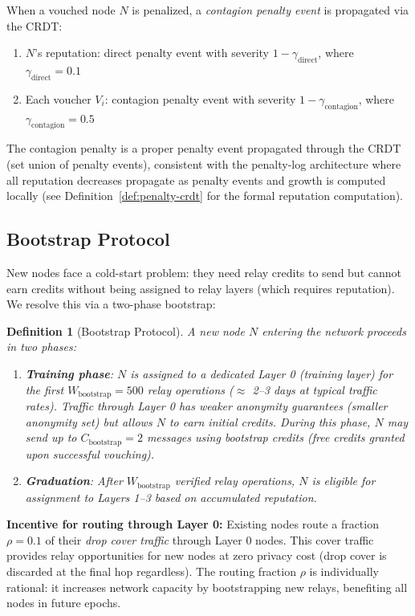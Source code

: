 \documentclass[11pt,a4paper]{article}
\newtheorem{definition}{Definition}
\begin{document}
When a vouched node $N$ is penalized, a \emph{contagion penalty event} is propagated via the CRDT:

\begin{enumerate}[nosep]
    \item $N$'s reputation: direct penalty event with severity $1 - \gamma_{\text{direct}}$, where $\gamma_{\text{direct}} = 0.1$
    \item Each voucher $V_i$: contagion penalty event with severity $1 - \gamma_{\text{contagion}}$, where $\gamma_{\text{contagion}} = 0.5$
\end{enumerate}

The contagion penalty is a proper penalty event propagated through the CRDT (set union of penalty events), consistent with the penalty-log architecture where all reputation decreases propagate as penalty events and growth is computed locally (see Definition~\ref{def:penalty-crdt} for the formal reputation computation).

\subsection{Bootstrap Protocol}
\label{sec:bootstrap}

New nodes face a cold-start problem: they need relay credits to send but cannot earn credits without being assigned to relay layers (which requires reputation). We resolve this via a two-phase bootstrap:

\begin{definition}[Bootstrap Protocol]
A new node $N$ entering the network proceeds in two phases:
\begin{enumerate}
    \item \textbf{Training phase}: $N$ is assigned to a dedicated Layer 0 (training layer) for the first $W_{\text{bootstrap}} = 500$ relay operations ($\approx$ 2--3 days at typical traffic rates). Traffic through Layer 0 has weaker anonymity guarantees (smaller anonymity set) but allows $N$ to earn initial credits. During this phase, $N$ may send up to $C_{\text{bootstrap}} = 2$ messages using \emph{bootstrap credits} (free credits granted upon successful vouching).
    \item \textbf{Graduation}: After $W_{\text{bootstrap}}$ verified relay operations, $N$ is eligible for assignment to Layers 1--3 based on accumulated reputation.
\end{enumerate}
\end{definition}

\textbf{Incentive for routing through Layer 0:} Existing nodes route a fraction $\rho = 0.1$ of their \emph{drop cover traffic} through Layer 0 nodes. This cover traffic provides relay opportunities for new nodes at zero privacy cost (drop cover is discarded at the final hop regardless). The routing fraction $\rho$ is individually rational: it increases network capacity by bootstrapping new relays, benefiting all nodes in future epochs.
\end{document}
